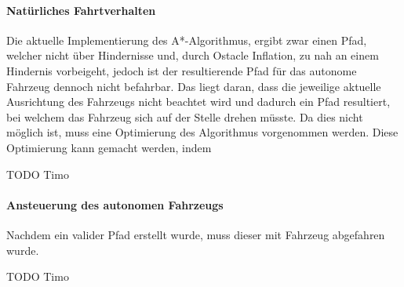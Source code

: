 \paragraph{Natürliches Fahrtverhalten} \mbox{}

Die aktuelle Implementierung des A*-Algorithmus, ergibt zwar einen Pfad, welcher nicht über Hindernisse und, durch Ostacle Inflation, zu nah an einem Hindernis vorbeigeht, jedoch ist der resultierende Pfad für das autonome Fahrzeug dennoch nicht befahrbar. Das liegt daran, dass die jeweilige aktuelle Ausrichtung des Fahrzeugs nicht beachtet wird und dadurch ein Pfad resultiert, bei welchem das Fahrzeug sich auf der Stelle drehen müsste. Da dies nicht möglich ist, muss eine Optimierung des Algorithmus vorgenommen werden. Diese Optimierung kann gemacht werden, indem 

TODO Timo

\paragraph{Ansteuerung des autonomen Fahrzeugs} \mbox{}

Nachdem ein valider Pfad erstellt wurde, muss dieser mit Fahrzeug abgefahren wurde. 

TODO Timo

\newpage
